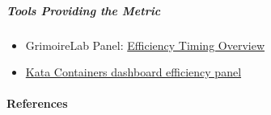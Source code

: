 \hypertarget{tools-providing-the-metric}{%
\subparagraph{Tools Providing the
Metric}\label{tools-providing-the-metric}}

\begin{itemize}
\tightlist
\item
  GrimoireLab Panel:
  \href{https://chaoss.github.io/grimoirelab-sigils/panels/efficiency-timing-overview/}{Efficiency
  Timing Overview}
\item
  \href{https://katacontainers.biterg.io/app/kibana\#/dashboard/cbbdd920-288c-11e9-b662-975152e57997}{Kata
  Containers dashboard efficiency panel}
\end{itemize}

\hypertarget{references}{%
\paragraph{References}\label{references}}
